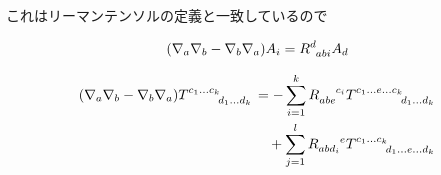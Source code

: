 \documentclass[dvipdfmx]{report} %
\begin{document}
これはリーマンテンソルの定義と一致しているので
\begin{tcolorbox}[title=共変微分とリーマンテンソルの関係性]
\begin{equation*}
\begin{split}
	( \nabla_a \nabla_b - \nabla_b \nabla_a )A_i = \tensor{R}{^d_{abi}}A_d
\end{split}
\end{equation*}
\end{tcolorbox}\noindent
\begin{tcolorbox}[title=リーマンテンソルの一般化]
\begin{equation*}
\begin{split}
	( \nabla_a \nabla_b - \nabla_b \nabla_a ) \tensor{T}{^{c_1...c_k}_{d_1...d_k}} &=
	- \sum^{k}_{i=1} \tensor{R}{_{abe}^{c_i}} \tensor{T}{^{c_1...e...c_k}_{d_1...d_k}} \\
	&\quad + \sum^{l}_{j=1} \tensor{R}{_{abd_i}^{e}} \tensor{T}{^{c_1...c_k}_{d_1...e...d_k}}
\end{split}
\end{equation*}
\end{tcolorbox}\noindent
\end{document}
